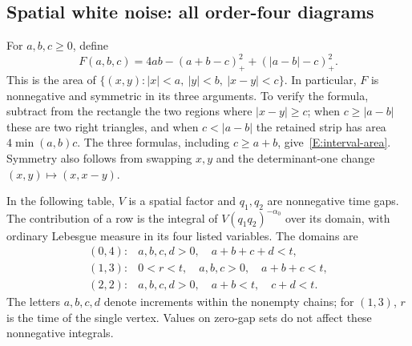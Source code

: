 \documentclass[12pt]{article}
\numberwithin{equation}{section}
\theoremstyle{definition}
\begin{document}
\subsection{Spatial white noise: all order-four diagrams}

For $a,b,c\ge0$, define
\begin{equation}\label{E:interval-area}
  F(a,b,c)=4ab-(a+b-c)_+^2+(|a-b|-c)_+^2.
\end{equation}
This is the area of
$\{(x,y):|x|<a,\ |y|<b,\ |x-y|<c\}$. In particular, $F$ is
nonnegative and symmetric in its three arguments. To verify the formula,
subtract from the rectangle the two regions where $|x-y|\ge c$;
when $c\ge|a-b|$ these are two right triangles, and when
$c<|a-b|$ the retained strip has area $4\min(a,b)c$.
The three formulas, including $c\ge a+b$, give~\eqref{E:interval-area}.
Symmetry also follows from swapping $x,y$ and the determinant-one change
$(x,y)\mapsto(x,x-y)$.

In the following table, $V$ is a spatial factor and $q_1,q_2$ are
nonnegative time gaps. The contribution of a row is the integral of
$V(q_1q_2)^{-\alpha_0}$ over its domain, with ordinary Lebesgue measure
in its four listed variables. The domains are
\[
  \begin{array}{ll}
    (0,4):&a,b,c,d>0,\quad a+b+c+d<t,\\
    (1,3):&0<r<t,\quad a,b,c>0,\quad a+b+c<t,\\
    (2,2):&a,b,c,d>0,\quad a+b<t,\quad c+d<t.
  \end{array}
\]
The letters $a,b,c,d$ denote increments within the nonempty chains;
for $(1,3)$, $r$ is the time of the single vertex. Values on zero-gap
sets do not affect these nonnegative integrals.
\end{document}
